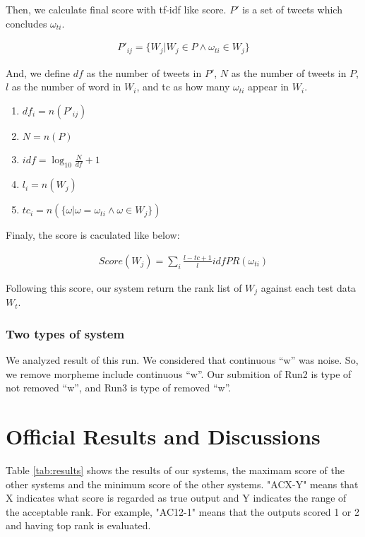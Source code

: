 \documentclass{../style/sig-alternate}
\begin{document}
Then, we calculate final score with tf-idf like score. $P'$ is a set of tweets which concludes $\omega_{ti}$. 

\begin{eqnarray}P'_{ij} = \{W_{j} | W_{j} \in P \wedge \omega_{ti} \in W_{j}\}\end{eqnarray}

And, we define $df$ as the number of tweets in $P'$, $N$ as the number of tweets in $P$, $l$ as the number of word in $W_{i}$, and tc as how many $\omega_{ti}$ appear in $W_{i}$.

\begin{enumerate}
    \item $df_{i} = n(P'_{ij})$
    \item $N = n(P)$
    \item $idf = \log_{10} \frac{N}{df} + 1$
    \item $l_{i} = n(W_{j})$
    \item $tc_{i} = n(\{\omega | \omega = \omega_{ti} \wedge \omega \in W_{j}\})$
\end{enumerate}

Finaly, the score is caculated like below:

\begin{eqnarray}Score(W_{j}) = \sum_{i} \frac{l-tc+1}{l} idf PR(\omega_{ti})\end{eqnarray}

Following this score, our system return the rank list of $W_{j}$ against each test data $W_{t}$.

\subsubsection{Two types of system}

  We analyzed result of this run. We considered that continuous ``w'' was noise. So, we remove morpheme include continuous ``w''.
  Our submition of Run2 is type of not removed ``w'', and Run3 is type of removed ``w''.



\section{Official Results and Discussions}
\label{sec:results}
Table \ref{tab:results} shows the results of our systems, the maximam score of the other systems and the minimum score of the other systems. 
"ACX-Y" means that X indicates what score is regarded as true output and Y indicates the range of the acceptable rank. For example, "AC12-1" means that the outputs scored 1 or 2 and having top rank is evaluated.
\end{document}
